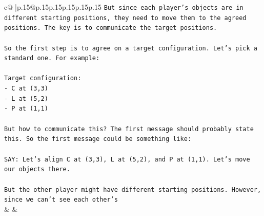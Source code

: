 \documentclass{article}
\begin{document}
{\begin{supertabular}{c@{$\;$}|p{.15\linewidth}@{}p{.15\linewidth}p{.15\linewidth}p{.15\linewidth}p{.15\linewidth}p{.15\linewidth}}
{{{\texttt{But since each player's objects are in different starting positions, they need to move them to the agreed positions. The key is to communicate the target positions.} \\
\\ 
\texttt{So the first step is to agree on a target configuration. Let's pick a standard one. For example:} \\
\\ 
\texttt{Target configuration:} \\
\texttt{{-} C at (3,3)} \\
\texttt{{-} L at (5,2)} \\
\texttt{{-} P at (1,1)} \\
\\ 
\texttt{But how to communicate this? The first message should probably state this. So the first message could be something like:} \\
\\ 
\texttt{SAY: Let's align C at (3,3), L at (5,2), and P at (1,1). Let's move our objects there.} \\
\\ 
\texttt{But the other player might have different starting positions. However, since we can't see each other's} \\
            }
        }
    }
    & & \\ \\


\end{supertabular}}
\end{document}
